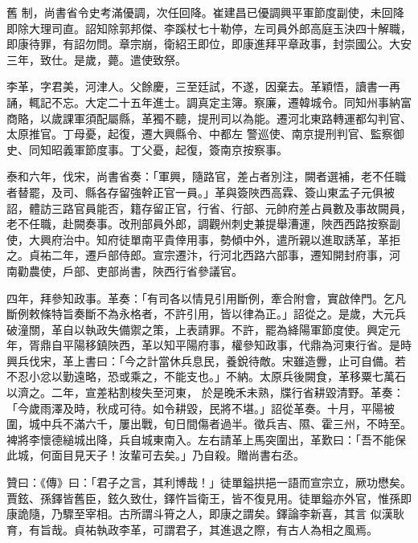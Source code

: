 \begin{pinyinscope}
 舊
 制，尚書省令史考滿優調，次任回降。崔建昌已優調興平軍節度副使，未回降即除大理司直。詔知除郭邦傑、李蹊杖七十勒停，左司員外郎高庭玉決四十解職，即康待罪，有詔勿問。章宗崩，衛紹王即位，即康進拜平章政事，封崇國公。大安三年，致仕。是歲，薨。遣使致祭。



 李革，字君美，河津人。父餘慶，三至廷試，不遂，因棄去。革穎悟，讀書一再誦，輒記不忘。大定二十五年進士。調真定主簿。察廉，遷韓城令。同知州事納富商賂，以歲課軍須配屬縣，革獨不聽，提刑司以為能。遷河北東路轉運都勾判官、太原推官。丁母憂，起復，遷大興縣令、中都左
 警巡使、南京提刑判官、監察御史、同知昭義軍節度事。丁父憂，起復，簽南京按察事。



 泰和六年，伐宋，尚書省奏：「軍興，隨路官，差占者別注，闕者選補，老不任職者替罷，及司、縣各存留強幹正官一員。」革與簽陜西高霖、簽山東孟子元俱被詔，體訪三路官員能否，籍存留正官，行省、行部、元帥府差占員數及事故闕員，老不任職，赴闕奏事。改刑部員外郎，調觀州刺史兼提舉漕運，陜西西路按察副使，大興府治中。知府徒單南平貴倖用事，勢傾中外，遣所親以進取誘革，革拒之。貞祐二年，遷戶部侍郎。宣宗遷汴，行河北西路六部事，遷知開封府事，河
 南勸農使，戶部、吏部尚書，陜西行省參議官。



 四年，拜參知政事。革奏：「有司各以情見引用斷例，牽合附會，實啟倖門。乞凡斷例敕條特旨奏斷不為永格者，不許引用，皆以律為正。」詔從之。是歲，大元兵破潼關，革自以執政失備禦之策，上表請罪。不許，罷為絳陽軍節度使。興定元年，胥鼎自平陽移鎮陜西，革以知平陽府事，權參知政事，代鼎為河東行省。是時興兵伐宋，革上書曰：「今之計當休兵息民，養銳待敵。宋雖造釁，止可自備。若不忍小忿以勤遠略，恐或乘之，不能支也。」不納。太原兵後闕食，革移粟七萬石以濟之。二年，宣差粘割梭失至河東，
 於是晚禾未熟，牒行省耕毀清野。革奏：「今歲雨澤及時，秋成可待。如令耕毀，民將不堪。」詔從革奏。十月，平陽被圍，城中兵不滿六千，屢出戰，旬日間傷者過半。徵兵吉、隰、霍三州，不時至。裨將李懷德縋城出降，兵自城東南入。左右請革上馬突圍出，革歎曰：「吾不能保此城，何面目見天子！汝輩可去矣。」乃自殺。贈尚書右丞。



 贊曰：《傳》曰：「君子之言，其利博哉！」徒單鎰拱挹一語而宣宗立，厥功懋矣。賈鉉、孫鐸皆舊臣，鉉久致仕，鐸忤旨衛王，皆不復見用。徒單鎰亦外官，惟孫即康詭隨，乃驟至宰相。古所謂斗筲之人，即康之謂矣。鐸論李新喜，其言
 似漢耿育，有旨哉。貞祐執政李革，可謂君子，其進退之際，有古人為相之風焉。



\end{pinyinscope}